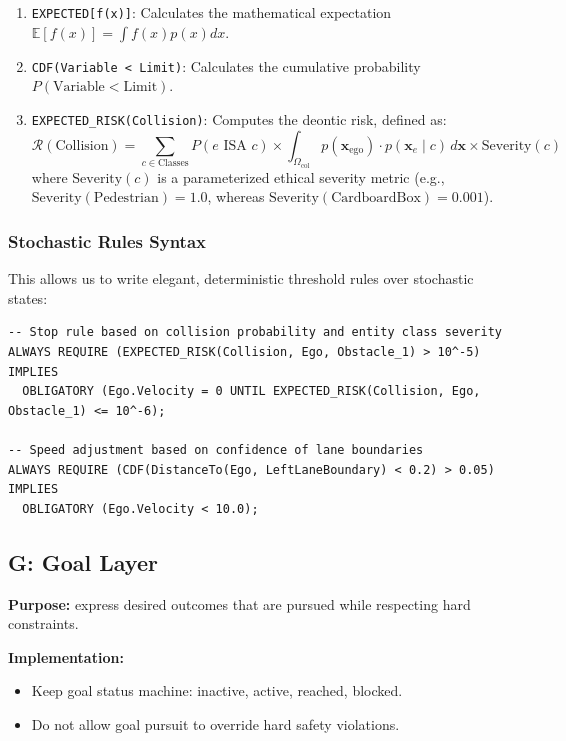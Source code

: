 \documentclass[11pt,a4paper]{article}
\begin{document}
\begin{enumerate}
    \item \texttt{EXPECTED[f(x)]}: Calculates the mathematical expectation $\mathbb{E}[f(x)] = \int f(x) p(x) dx$.
    \item \texttt{CDF(Variable < Limit)}: Calculates the cumulative probability $P(\text{Variable} < \text{Limit})$.
    \item \texttt{EXPECTED\_RISK(Collision)}: Computes the deontic risk, defined as:
    \[
    \mathcal{R}(\text{Collision}) = \sum_{c \in \text{Classes}} P(e \text{ ISA } c) \times \int_{\Omega_{\text{col}}} p(\mathbf{x}_{\text{ego}}) \cdot p(\mathbf{x}_e \mid c) \, d\mathbf{x} \times \text{Severity}(c)
    \]
    where $\text{Severity}(c)$ is a parameterized ethical severity metric (e.g., $\text{Severity}(\text{Pedestrian}) = 1.0$, whereas $\text{Severity}(\text{CardboardBox}) = 0.001$).
\end{enumerate}

\subsubsection{Stochastic Rules Syntax}
This allows us to write elegant, deterministic threshold rules over stochastic states:

\begin{lstlisting}
-- Stop rule based on collision probability and entity class severity
ALWAYS REQUIRE (EXPECTED_RISK(Collision, Ego, Obstacle_1) > 10^-5)
IMPLIES 
  OBLIGATORY (Ego.Velocity = 0 UNTIL EXPECTED_RISK(Collision, Ego, Obstacle_1) <= 10^-6);

-- Speed adjustment based on confidence of lane boundaries
ALWAYS REQUIRE (CDF(DistanceTo(Ego, LeftLaneBoundary) < 0.2) > 0.05)
IMPLIES
  OBLIGATORY (Ego.Velocity < 10.0);
\end{lstlisting}

\subsection{G: Goal Layer}
\textbf{Purpose:} express desired outcomes that are pursued while respecting hard constraints.

\textbf{Implementation:}
\begin{itemize}[leftmargin=*]
  \item Keep goal status machine: inactive, active, reached, blocked.
  \item Do not allow goal pursuit to override hard safety violations.
\end{itemize}
\end{document}
